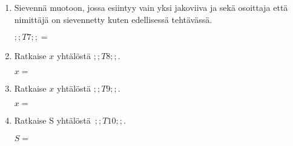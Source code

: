 \documentclass[finnish, a4paper, 12pt]{article}
\begin{document}
\begin{enumerate}[leftmargin=*]
		\vspace{8pt}
		
		\item %
		Sievennä %
		muotoon, jossa esiintyy vain yksi jakoviiva ja sekä osoittaja
		että nimittäjä on sievennetty kuten edellisessä tehtävässä.
		
		\(
		\displaystyle
		;;T7;; =
		\) %
		
		\vspace{8pt}
		
		\item %
		Ratkaise \(x\) yhtälöstä \(;;T8;;\).
		
		\(
		x = 
		\)	%
		
		\vspace{8pt}
		
		\item %
		Ratkaise \(x\) yhtälöstä \(;;T9;;\).
		
		\(
		x = 		
		\)	%
		
		\vspace{8pt}
		
		\item %
		Ratkaise S yhtälöstä 
		\(
		\displaystyle \,
		;;T10;; .
		\)	
		
		\(
		S = 
		\) %
		
	\end{enumerate}
	
	
\end{document}
